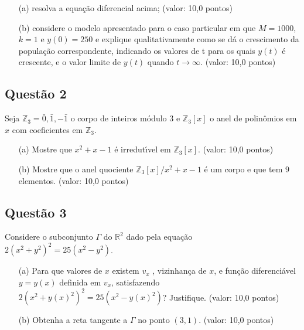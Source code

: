 \documentclass{report}
\begin{document}
\begin{enumerate}

\item[(a)] resolva a equa\c c\~ao diferencial acima; (valor: 10,0 pontos)

\item[(b)] considere o modelo apresentado para o caso particular em que $M = 1000$, $k = 1$ e $y (0) = 250$ e explique qualitativamente como se d\'a o crescimento da popula\c c\~ao correspondente, indicando os valores de t para os quais $y(t)$ \'e crescente, e o valor limite de $y(t)$ quando $t \to \infty$. (valor: 10,0 pontos)

\end{enumerate}

\subsection{\color{blue} Quest\~ao 2}

Seja $\mathbb Z_3 = {\bar 0 , \bar 1 , -\bar 1}$ o corpo de inteiros m\'odulo $3$ e $\mathbb Z_3 [x]$ o anel de polinômios em $x$ com coeficientes em $\mathbb Z_3$.

\begin{enumerate}

\item[(a)] Mostre que $x^2 + x - 1$ \'e irredut\'\i vel em $\mathbb Z_3 [x]$. (valor: 10,0 pontos)

\item[(b)] Mostre que o anel quociente $\displaystyle {\mathbb Z_3 [x]}/{x^2 + x - 1}$ \'e um corpo e que tem $9$ elementos. (valor: 10,0 pontos)

\end{enumerate}

\subsection{\color{blue} Quest\~ao 3}

Considere o subconjunto $\Gamma$ do $\mathbb R^2$ dado pela equa\c c\~ao $2(x^2+ y^2)^2=25(x^2-y^2)$.

\begin{enumerate}

\item[(a)] Para que valores de $x$ existem $v_x$ , vizinhan\c ca de $x$, e fun\c c\~ao diferenci\'avel $y = y(x)$ definida em $v_x$, satisfazendo $2(x^2+ y(x)^2)^2=25 (x^2-y(x)^2)$? Justifique. (valor: 10,0 pontos) 

\item[(b)] Obtenha a reta tangente a $\Gamma$ no ponto $(3, 1)$.
(valor: 10,0 pontos)

\end{enumerate}
\end{document}
